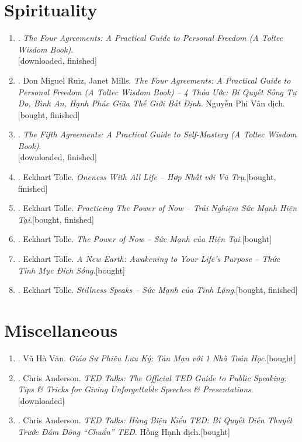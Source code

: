\documentclass{article}
\begin{document}

\section{Spirituality}

\begin{enumerate}
	\item \cite{Ruiz2011}. \textit{The Four Agreements: A Practical Guide to Personal Freedom (A Toltec Wisdom Book)}.\\\mbox{}\hfill\textsf{[downloaded, finished]}
	\item \cite{Ruiz_Mills2022}. Don Miguel Ruiz, Janet Mills. \textit{The Four Agreements: A Practical Guide to Personal Freedom (A Toltec Wisdom Book) -- 4 Thỏa Ước: Bí Quyết Sống Tự Do, Bình An, Hạnh Phúc Giữa Thế Giới Bất Định}. Nguyễn Phi Vân dịch.\hfill\textsf{[bought, finished]}
	\item \cite{Ruiz_Ruiz2011}. \textit{The Fifth Agreements: A Practical Guide to Self-Mastery (A Toltec Wisdom Book)}.\\\mbox{}\hfill\textsf{[downloaded, finished]}
	\item \cite{Tolle2021a}. Eckhart Tolle. \textit{Oneness With All Life -- Hợp Nhất với Vũ Trụ}.\hfill\textsf{[bought, finished]}
	\item \cite{Tolle2021b}. Eckhart Tolle. \textit{Practicing The Power of Now -- Trải Nghiệm Sức Mạnh Hiện Tại}.\hfill\textsf{[bought, finished]}
	\item \cite{Tolle2021c}. Eckhart Tolle. \textit{The Power of Now -- Sức Mạnh của Hiện Tại}.\hfill\textsf{[bought]}
	\item \cite{Tolle2021d}. Eckhart Tolle. \textit{A New Earth: Awakening to Your Life's Purpose -- Thức Tỉnh Mục Đích Sống}.\hfill\textsf{[bought]}
	\item \cite{Tolle2022}. Eckhart Tolle. \textit{Stillness Speaks -- Sức Mạnh của Tĩnh Lặng}.\hfill\textsf{[bought, finished]}
\end{enumerate}


\section{Miscellaneous}

\begin{enumerate}
	\item \cite{VanVu2022}. Vũ Hà Văn. \textit{Giáo Sư Phiêu Lưu Ký: Tản Mạn với 1 Nhà Toán Học}.\hfill\textsf{[bought]}
	\item \cite{Anderson2016}. Chris Anderson. \textit{TED Talks: The Official TED Guide to Public Speaking: Tips \& Tricks for Giving Unforgettable Speeches \& Presentations}.\hfill\textsf{[downloaded]}
	\item \cite{Anderson2022}. Chris Anderson. \textit{TED Talks: Hùng Biện Kiểu TED: Bí Quyết Diễn Thuyết Trước Đám Đông ``Chuẩn'' TED}. Hồng Hạnh dịch.\hfill\textsf{[bought]}
\end{enumerate}


\printbibliography[heading=bibintoc]
	
\end{document}
